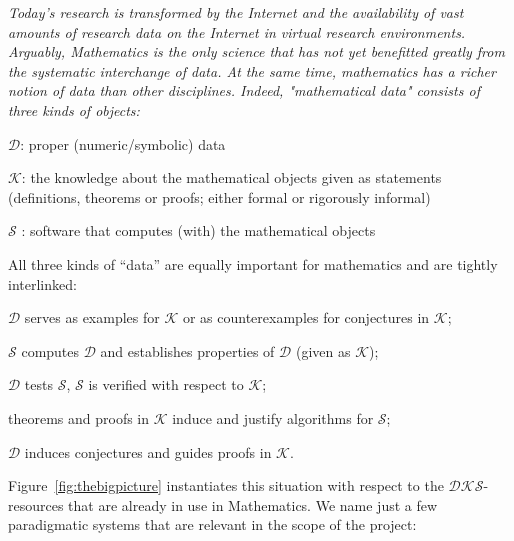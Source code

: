 \begin{center}
\begin{boxedminipage}{.95\textwidth}\em 
Today's research is transformed by the Internet and the availability of vast amounts of
research data on the Internet in virtual research environments. Arguably, Mathematics is
the only science that has not yet benefitted greatly from the systematic interchange of
data. At the same time, mathematics has a richer notion of data than other disciplines.
Indeed, "mathematical data" consists of three kinds of objects:
\begin{compactitem}
\item $\mathcal{D}$: proper (numeric/symbolic) data
\item $\mathcal{K}$: the knowledge about the mathematical objects given as statements
  (definitions, theorems or proofs; either formal or rigorously informal)
\item $\mathcal{S}$ : software that computes (with) the mathematical objects
\end{compactitem}

All three kinds of ``data'' are equally important for mathematics and are tightly
interlinked:
\begin{compactitem}
\item $\mathcal{D}$ serves as examples for $\mathcal{K}$ or as counterexamples for
  conjectures in $\mathcal{K}$;
\item $\mathcal{S}$ computes $\mathcal{D}$ and establishes properties of $\mathcal{D}$
  (given as $\mathcal{K}$);
\item $\mathcal{D}$ tests $\mathcal{S}$, $\mathcal{S}$ is verified with respect to
  $\mathcal{K}$;
\item theorems and proofs in $\mathcal{K}$ induce and justify algorithms for
  $\mathcal{S}$;
\item $\mathcal{D}$ induces conjectures and guides proofs in $\mathcal{K}$.
\end{compactitem}
\end{boxedminipage}
\end{center}
Figure~\ref{fig:thebigpicture} instantiates this situation with respect to the
$\mathcal{DKS}$-resources that are already in use in Mathematics. We name just a few
paradigmatic systems that are relevant in the scope of the \TheProject project: 
